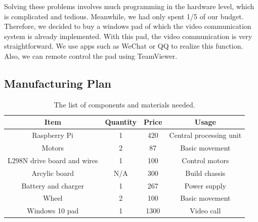 \documentclass[12pt]{article}
\begin{document}
Solving these problems involves much programming in the hardware level, which is complicated and tedious. Meanwhile, we had only spent 1/5 of our budget. Therefore, we decided to buy a windows pad of which the video communication system is already implemented. With this pad, the video communication is very straightforward. We use apps such as WeChat or QQ to realize this function. Also, we can remote control the pad using TeamViewer.

\subsection{Manufacturing Plan}


\begin{table}[H]
	\centering
	\begin{tabular}{|c|c|c|c|}
		\hline
		Item& Quantity &  Price & Usage  \\
		\hline
		Raspberry Pi& 1 & 420  & Central processing unit  \\
		\hline
		Motors&  2&  87&   Basic movement\\
		\hline
		L298N drive board and wires& 1 & 100 &  Control motors\\
		\hline
		Arcylic board& N/A & 300 & Build chassis \\
		\hline
		Battery and charger&  1& 267 & Power supply  \\
		\hline
		Wheel &  2&  100& Basic movement \\
		\hline
		Windows 10 pad&  1& 1300 & Video call \\
		\hline
	\end{tabular}
	\caption{The list of components and materials needed.}
	\label{tab::material}
\end{table}
\end{document}
